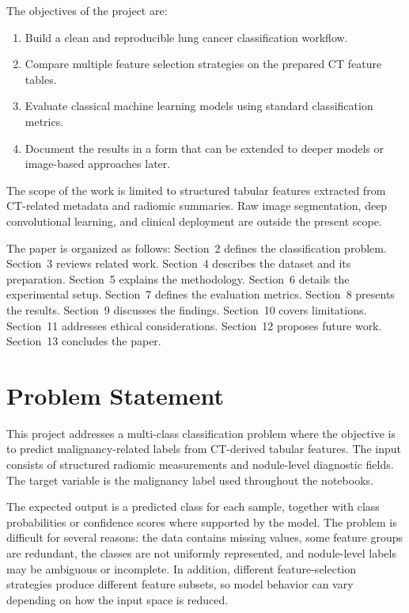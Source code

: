\documentclass[11pt,a4paper]{article}
\begin{document}
The objectives of the project are:
\begin{enumerate}[leftmargin=*]
    \item Build a clean and reproducible lung cancer classification workflow.
    \item Compare multiple feature selection strategies on the prepared CT feature tables.
    \item Evaluate classical machine learning models using standard classification metrics.
    \item Document the results in a form that can be extended to deeper models or image-based approaches later.
\end{enumerate}

The scope of the work is limited to structured tabular features extracted from CT-related metadata and radiomic summaries. Raw image segmentation, deep convolutional learning, and clinical deployment are outside the present scope.

The paper is organized as follows: Section~2 defines the classification problem. Section~3 reviews related work. Section~4 describes the dataset and its preparation. Section~5 explains the methodology. Section~6 details the experimental setup. Section~7 defines the evaluation metrics. Section~8 presents the results. Section~9 discusses the findings. Section~10 covers limitations. Section~11 addresses ethical considerations. Section~12 proposes future work. Section~13 concludes the paper.

\section{Problem Statement}


This project addresses a multi-class classification problem where the objective is to predict malignancy-related labels from CT-derived tabular features. The input consists of structured radiomic measurements and nodule-level diagnostic fields. The target variable is the malignancy label used throughout the notebooks.

The expected output is a predicted class for each sample, together with class probabilities or confidence scores where supported by the model. The problem is difficult for several reasons: the data contains missing values, some feature groups are redundant, the classes are not uniformly represented, and nodule-level labels may be ambiguous or incomplete. In addition, different feature-selection strategies produce different feature subsets, so model behavior can vary depending on how the input space is reduced.
\end{document}
